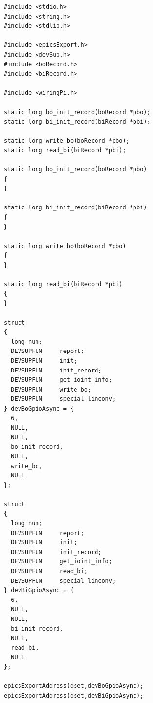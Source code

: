 \documentclass[11pt
  , a4paper
  , article
  , oneside
]{memoir}
\begin{document}
\begin{lstlisting}[style=termstylenumber, caption={Editing \texttt{/etc/fai/NFSROOT}}, label={list:nfsroot-file}]
#include <stdio.h>
#include <string.h>
#include <stdlib.h>

#include <epicsExport.h>
#include <devSup.h>
#include <boRecord.h>
#include <biRecord.h>

#include <wiringPi.h>

static long bo_init_record(boRecord *pbo);
static long bi_init_record(biRecord *pbi);

static long write_bo(boRecord *pbo);
static long read_bi(biRecord *pbi);

static long bo_init_record(boRecord *pbo)
{
}

static long bi_init_record(biRecord *pbi)
{
}

static long write_bo(boRecord *pbo)
{
}

static long read_bi(biRecord *pbi)
{
}

struct
{
  long num;
  DEVSUPFUN     report;
  DEVSUPFUN     init;
  DEVSUPFUN     init_record;
  DEVSUPFUN     get_ioint_info;
  DEVSUPFUN     write_bo;
  DEVSUPFUN     special_linconv;
} devBoGpioAsync = {
  6,
  NULL,
  NULL,
  bo_init_record,
  NULL,
  write_bo,
  NULL
};

struct
{
  long num;
  DEVSUPFUN     report;
  DEVSUPFUN     init;
  DEVSUPFUN     init_record;
  DEVSUPFUN     get_ioint_info;
  DEVSUPFUN     read_bi;
  DEVSUPFUN     special_linconv;
} devBiGpioAsync = {
  6,
  NULL,
  NULL,
  bi_init_record,
  NULL,
  read_bi,
  NULL
};

epicsExportAddress(dset,devBoGpioAsync);
epicsExportAddress(dset,devBiGpioAsync);
\end{lstlisting}
\end{document}
